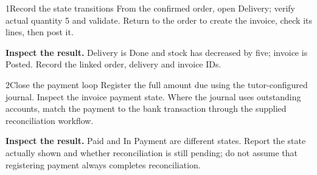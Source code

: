 
\begin{labquestion}{1}{Record the state transitions}
From the confirmed order, open Delivery; verify actual quantity 5 and validate. Return to the order to create the invoice, check its lines, then post it.
\end{labquestion}
\begin{labanswer}\textbf{Inspect the result.} Delivery is Done and stock has decreased by five; invoice is Posted. Record the linked order, delivery and invoice IDs.\end{labanswer}

\begin{labquestion}{2}{Close the payment loop}
Register the full amount due using the tutor-configured journal. Inspect the invoice payment state. Where the journal uses outstanding accounts, match the payment to the bank transaction through the supplied reconciliation workflow.
\end{labquestion}
\begin{labanswer}\textbf{Inspect the result.} Paid and In Payment are different states. Report the state actually shown and whether reconciliation is still pending; do not assume that registering payment always completes reconciliation.\end{labanswer}
